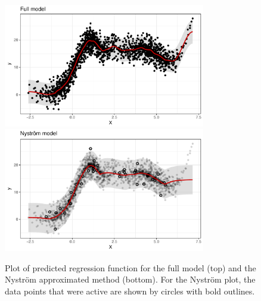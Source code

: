 \documentclass[showframe,11pt]{report}\usepackage[]{graphicx}\usepackage[]{color}
\newenvironment{knitrout}{}{} %
\begin{document}
\begin{knitrout}
\color{fgcolor}\begin{figure}[htbp]

{\centering \includegraphics[width=0.785\textwidth]{figure/04-nystrom_plot-1} 
\includegraphics[width=0.785\textwidth]{figure/04-nystrom_plot-2} 

}

\caption[Plot of predicted regression function for the full model (top) and the Nystr\"om approximated method (bottom)]{Plot of predicted regression function for the full model (top) and the Nystr\"om approximated method (bottom). For the Nystr\"om plot, the data points that were active are shown by circles with bold outlines.}\label{fig:nystrom.plot}
\end{figure}


\end{knitrout}
\end{document}
